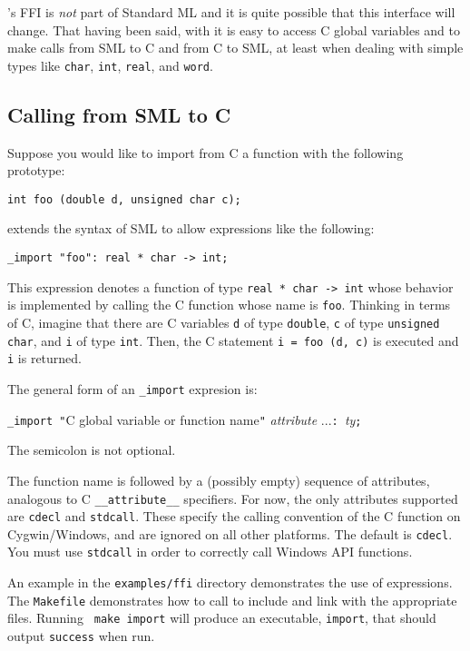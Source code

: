 %
{\mlton}'s FFI is {\em not} part of Standard ML and it is quite
possible that this interface will change.  That having been said, with
{\mlton} it is easy to access C global variables and to make calls
from SML to C and from C to SML, at least when dealing with simple
types like {\tt char}, {\tt int}, {\tt real}, and {\tt word}.
%
\subsection{Calling from SML to C}

Suppose you would like to import from C a function with the following
prototype:
\begin{verbatim}
int foo (double d, unsigned char c);
\end{verbatim}
{\mlton} extends the syntax of SML to allow expressions like the following:
\begin{verbatim}
_import "foo": real * char -> int;
\end{verbatim}
This expression denotes a function of type {\tt real * char -> int}
whose behavior is implemented by calling the C function whose name is
{\tt foo}.  Thinking in terms of C, imagine that there are C
variables {\tt d} of type {\tt double}, {\tt c} of type {\tt unsigned
char}, and {\tt i} of type {\tt int}.  Then, the C statement
\mbox{\tt i = foo (d, c)} is executed and {\tt i} is returned.

The general form of an \verb+_import+ expresion is:
\begin{center}
{\tt \_import "}C global variable or function name{\tt "} {\it
attribute} ...{\tt : }{\it ty}{\tt ;}
\end{center}
The semicolon is not optional.

The function name is followed by a (possibly empty) sequence of
attributes, analogous to C {\tt\_\_attribute\_\_} specifiers.  For
now, the only attributes supported are {\tt cdecl} and {\tt stdcall}.
These specify the calling convention of the C function on
Cygwin/Windows, and are ignored on all other platforms.  The default
is {\tt cdecl}.  You must use {\tt stdcall} in order to correctly call
Windows API functions.

An example in the {\tt examples/ffi} directory demonstrates the use of
{} expressions.  The {\tt Makefile} demonstrates how to call
{\mlton} to include and link with the appropriate files.  Running {\tt
make import} will produce an executable, {\tt import}, that should
output {\tt success} when run.

